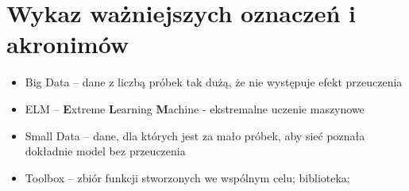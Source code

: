 \documentclass{article}
\begin{document}
\section{Wykaz ważniejszych oznaczeń i akronimów}
\begin{itemize}[label={},leftmargin=*]
\item Big Data -- dane z liczbą próbek tak dużą, że nie występuje efekt przeuczenia
\item ELM -- \textbf{E}xtreme \textbf{L}earning \textbf{M}achine - ekstremalne uczenie maszynowe
\item Small Data -- dane, dla których jest za mało próbek, aby sieć poznała dokładnie model bez przeuczenia
\item Toolbox -- zbiór funkcji stworzonych we wspólnym celu; biblioteka;
\end{itemize}
\end{document}
